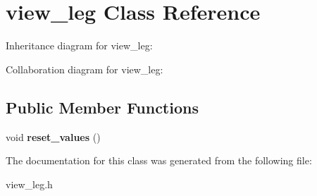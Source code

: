 \hypertarget{classview__leg}{}\section{view\+\_\+leg Class Reference}
\label{classview__leg}


Inheritance diagram for view\+\_\+leg\+:


Collaboration diagram for view\+\_\+leg\+:
\subsection*{Public Member Functions}
\begin{DoxyCompactItemize}
\item 
void {\bfseries reset\+\_\+values} ()\hypertarget{classview__leg_a2220bc5d7006d15837aa291fcd36744e}{}\label{classview__leg_a2220bc5d7006d15837aa291fcd36744e}

\end{DoxyCompactItemize}


The documentation for this class was generated from the following file\+:\begin{DoxyCompactItemize}
\item 
view\+\_\+leg.\+h\end{DoxyCompactItemize}
